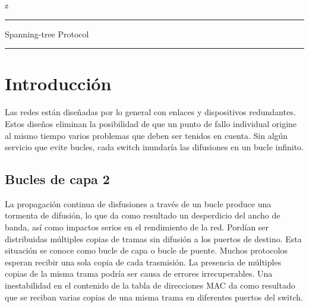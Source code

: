 z\documentclass[12pt]{article}
\begin{document}

\begin{center}

\noindent\rule{\textwidth}{1pt}
\huge{Spanning-tree Protocol}
\noindent\rule{\textwidth}{1pt}
\end{center}
 
 \section{Introducción}   
Las redes están diseñadas por lo general con enlaces y dispositivos redundantes. Estos diseños eliminan la posibilidad de que un punto de fallo individual origine al mismo tiempo varios problemas que deben ser tenidos en cuenta. Sin algún servicio que evite bucles, cada switch inundaría las difusiones en un bucle infinito.

 \subsection{Bucles de capa 2}
La propagación continua de disfusiones a través de un bucle produce una tormenta de difusión, lo que da como resultado un desperdicio del ancho de banda, así como impactos serios en el rendimiento de la red. Pordían ser distribuidas múltiples copias de tramas sin difusión a los puertos de destino. Esta situación se conoce como bucle de capa o bucle de puente.
Muchos protocolos esperan recibir una sola copia de cada trasmisión. La presencia de múltiples copias de la misma trama podría ser causa de errores irrecuperables. Una inestabilidad en el contenido de la tabla de direcciones MAC da como resultado que se reciban varias copias de una misma trama en diferentes puertos del switch.
\end{document}
